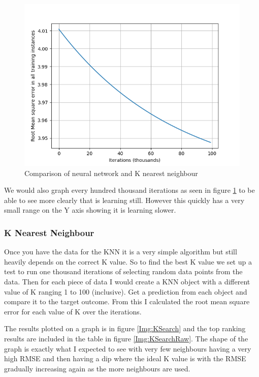 \documentclass[11pt]{article}
\begin{document}
	 \begin{figure}[!htb]
	 	\centering
	 		\includegraphics{Resources/PartTwo/LearningGraphs/20220111_184633_1000_1.png}
	 		\caption{Comparison of neural network and K nearest neighbour}
	 		\label{Img:NNTrainB}
	 \end{figure}
 
 	We would also graph every hundred thousand iterations  as seen in figure \ref{Img:NNTrainB} to be able to see more clearly that is learning still. However this quickly has a very small range on the Y axis showing it is learning slower.
	
	\subsubsection{K Nearest Neighbour}
	Once you have the data for the KNN it is a very simple algorithm but still heavily depends on the correct K value. So to find the best K value we set up a test to run one thousand iterations of selecting random data points from the data. Then for each piece of data I would create a KNN object with a different value of K ranging 1 to 100 (inclusive). Get a prediction from each object and compare it to the target outcome. From this I calculated the root mean square error for each value of K over the iterations.
	
	The results plotted on a graph is in figure \ref{Img:KSearch} and the top ranking results are included in the table in figure \ref{Img:KSearchRaw}.	
	The shape of the graph is exactly what I expected to see with very few neighbours having a very high RMSE and then having a dip where the ideal K value is with the RMSE gradually increasing again as the more neighbours are used.
	
\end{document}
